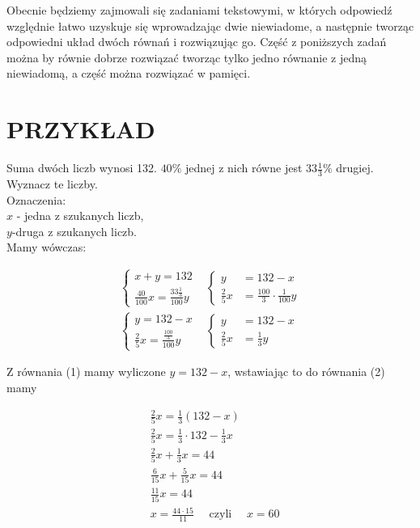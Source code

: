\documentclass[10pt]{article}
\begin{document}
Obecnie będziemy zajmowali się zadaniami tekstowymi, w których odpowiedź względnie łatwo uzyskuje się wprowadzając dwie niewiadome, a następnie tworząc odpowiedni układ dwóch równań i rozwiązując go. Część z poniższych zadań można by równie dobrze rozwiązać tworząc tylko jedno równanie z jedną niewiadomą, a część można rozwiązać w pamięci.

\section*{PRZYKŁAD}
Suma dwóch liczb wynosi 132. \(40 \%\) jednej z nich równe jest \(33 \frac{1}{3} \%\) drugiej. Wyznacz te liczby.\\
Oznaczenia:\\
\(x\) - jedna z szukanych liczb,\\
\(y\)-druga z szukanych liczb.\\
Mamy wówczas:

\[
\begin{array}{ll} 
\begin{cases}x+y=132 \\
\frac{40}{100} x=\frac{33 \frac{1}{3}}{100} y\end{cases} & \begin{cases}y & =132-x \\
\frac{2}{5} x & =\frac{100}{3} \cdot \frac{1}{100} y\end{cases} \\
\left\{\begin{array}{lll}
y=132-x \\
\frac{2}{5} x=\frac{\frac{100}{3}}{100} y
\end{array}\right. & \begin{cases}y & =132-x \\
\frac{2}{5} x & =\frac{1}{3} y\end{cases}
\end{array}
\]

Z równania (1) mamy wyliczone \(y=132-x\), wstawiając to do równania (2) mamy

\[
\begin{aligned}
& \frac{2}{5} x=\frac{1}{3}(132-x) \\
& \frac{2}{5} x=\frac{1}{3} \cdot 132-\frac{1}{3} x \\
& \frac{2}{5} x+\frac{1}{3} x=44 \\
& \frac{6}{15} x+\frac{5}{15} x=44 \\
& \frac{11}{15} x=44 \\
& x=\frac{44 \cdot 15}{11} \quad \text { czyli } \quad x=60
\end{aligned}
\]
\end{document}
